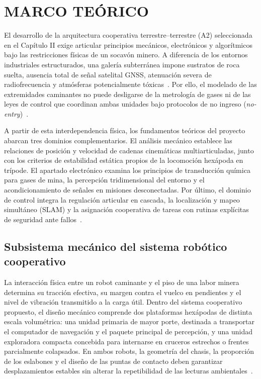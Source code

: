 \chapter{MARCO TEÓRICO}

El desarrollo de la arquitectura cooperativa terrestre--terrestre (A2) seleccionada en el Capítulo II exige articular principios mecánicos, electrónicos y algorítmicos bajo las restricciones físicas de un socavón minero. A diferencia de los entornos industriales estructurados, una galería subterránea impone sustratos de roca suelta, ausencia total de señal satelital GNSS, atenuación severa de radiofrecuencia y atmósferas potencialmente tóxicas~\cite{AdvancesMining_2023, KimChoi_2025_MineMapping}. Por ello, el modelado de las extremidades caminantes no puede desligarse de la metrología de gases ni de las leyes de control que coordinan ambas unidades bajo protocolos de no ingreso (\textit{no-entry})~\cite{InsectInspired_2020, MINEM_DS024_2016, OSINERGMIN_BoletinGSM_Ventilacion_2020}.

A partir de esta interdependencia física, los fundamentos teóricos del proyecto abarcan tres dominios complementarios. El análisis mecánico establece las relaciones de posición y velocidad de cadenas cinemáticas multiarticuladas, junto con los criterios de estabilidad estática propios de la locomoción hexápoda en trípode. El apartado electrónico examina los principios de transducción química para gases de mina, la percepción tridimensional del entorno y el acondicionamiento de señales en misiones desconectadas. Por último, el dominio de control integra la regulación articular en cascada, la localización y mapeo simultáneo (SLAM) y la asignación cooperativa de tareas con rutinas explícitas de seguridad ante fallos~\cite{siciliano2010robotics, thrun2005probabilistic, threeLoopControl1}.


\section{Subsistema mecánico del sistema robótico cooperativo}
\label{sec:subsistema_mecanico}

La interacción física entre un robot caminante y el piso de una labor minera determina su tracción efectiva, su margen contra el vuelco en pendientes y el nivel de vibración transmitido a la carga útil. Dentro del sistema cooperativo propuesto, el diseño mecánico comprende dos plataformas hexápodas de distinta escala volumétrica: una unidad primaria de mayor porte, destinada a transportar el computador de navegación y el paquete principal de percepción, y una unidad exploradora compacta concebida para internarse en cruceros estrechos o frentes parcialmente colapsados. En ambos robots, la geometría del chasis, la proporción de los eslabones y el diseño de las puntas de contacto deben garantizar desplazamientos estables sin alterar la repetibilidad de las lecturas ambientales~\cite{AdvancesMining_2023, Sensors2021_HexapodReview}.

